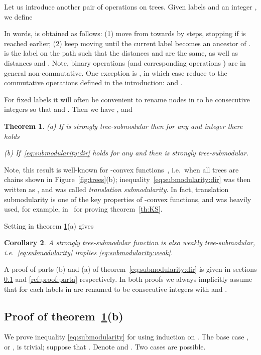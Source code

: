 \documentclass[11pt,onecolumn]{article}
\newtheorem{theorem}{Theorem}
\newtheorem{corollary}[theorem]{Corollary}
\begin{document}
Let us introduce another pair of operations on trees. 
Given labels  and an integer , we define 

In words,  is obtained as follows: (1) move from  towards  by  steps,
stopping if  is reached earlier; (2) keep moving until the current label becomes an ancestor of .
 is the label on the path  such that the distances
 and  are the same,
as well as distances  and .
Note, binary operations  
(and corresponding operations ) are in general non-commutative.
One exception is , in which case   reduce to the commutative
operations defined in the introduction:  and .

For fixed labels  it will often be convenient to rename nodes in  to be
consecutive integers so that  and . Then we have ,  and


\begin{theorem} (a) If  is strongly tree-submodular then for any  and integer  there holds
{\em

\em }
(b) If~\eqref{eq:submodularity:dir} holds for any  and  then  is strongly tree-submodular.
\label{th:submodularity:dir}
\end{theorem}

Note, this result is well-known for -convex functions~\cite[section 7.1]{Murota:book},
i.e.\ when all trees are chains shown in Figure~\ref{fig:trees}(b); inequality~\eqref{eq:submodularity:dir} was then written as 
, and was called {\em translation submodularity}.
In fact, translation submodularity is one of the key properties of -convex functions, and was heavily used, for example, in~\cite{KS:09}
for proving theorem~\ref{th:KS}.

Setting  in theorem \ref{th:submodularity:dir}(a) gives
\begin{corollary}
A strongly tree-submodular function  is also weakly tree-submodular, i.e.\ \eqref{eq:submodularity} implies \eqref{eq:submodularity:weak}.
\end{corollary}

A proof of parts (b) and (a) of theorem~\ref{eq:submodularity:dir} is given 
in sections \ref{ref:proof:partb} and \ref{ref:proof:parta} respectively.
In both proofs we always implicitly assume
that for each  labels in  are renamed to be consecutive integers with  and .

\subsection{Proof of theorem~\ref{th:submodularity:dir}(b)}\label{ref:proof:partb}
We prove inequality \eqref{eq:submodularity} for  using induction on .
The base case , or , is trivial; suppose that .
Denote  and . Two cases are possible.
\end{document}
